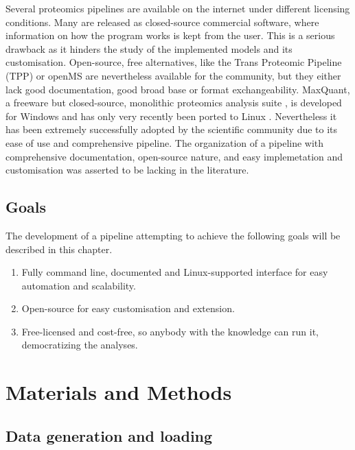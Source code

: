 Several proteomics pipelines are available on the internet under different licensing conditions. Many are released as closed-source commercial software, where information on how the program works is kept from the user. This is a serious drawback as it hinders the study of the implemented models and its customisation. Open-source, free alternatives, like the Trans Proteomic Pipeline (\ac{TPP}) \cite{Deutsch2011} or openMS \cite{Sturm2008} are nevertheless available for the community, but they either lack good documentation, good broad base or format exchangeability. MaxQuant, a freeware but closed-source, monolithic proteomics analysis suite \cite{Cox2008}, is developed for Windows and has only very recently been ported to Linux \cite{Sinitcyn2018}. Nevertheless it has been extremely successfully adopted by the scientific community due to its ease of use and comprehensive pipeline. The organization of a pipeline with comprehensive documentation, open-source nature, and easy implemetation and customisation was asserted to be lacking in the literature.

\subsection{Goals}

The development of a pipeline attempting to achieve the following goals will be described in this chapter.

\begin{enumerate}

\item Fully command line, documented and Linux-supported interface for easy automation and scalability.
\item Open-source for easy customisation and extension.
\item Free-licensed and cost-free, so anybody with the knowledge can run it, democratizing the analyses.
\end{enumerate}

\section{Materials and Methods}

\subsection{Data generation and loading}

